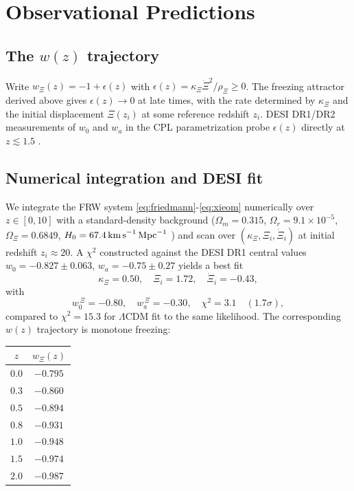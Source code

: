 \documentclass[11pt,reqno]{amsart}
\theoremstyle{plain}
\theoremstyle{definition}
\theoremstyle{remark}
\begin{document}
\section{Observational Predictions}\label{sec:obs}

\subsection{The $w(z)$ trajectory}

Write $w_\Xi(z)=-1+\epsilon(z)$ with $\epsilon(z)=\kappa_\Xi\dot\Xi^{2}/\rho_\Xi\ge0$.
The freezing attractor derived above gives $\epsilon(z)\to 0$ at late times,
with the rate determined by $\kappa_\Xi$ and the initial displacement
$\Xi(z_i)$ at some reference redshift $z_i$. DESI DR1/DR2 measurements of
$w_0$ and $w_a$ in the CPL parametrization probe $\epsilon(z)$ directly at
$z\lesssim 1.5$ \cite{DESI2024BAO,DESI2024VI}.

\subsection{Numerical integration and DESI fit}\label{sec:desifit}

We integrate the FRW system \eqref{eq:friedmann}-\eqref{eq:xieom} numerically
over $z\in[0,10]$ with a standard-density background
($\Omega_m=0.315$, $\Omega_r=9.1\times10^{-5}$, $\Omega_\Xi=0.6849$,
$H_0=67.4\,\text{km\,s}^{-1}\,\text{Mpc}^{-1}$
\cite{Planck2020}) and scan over $(\kappa_\Xi,\Xi_i,\dot\Xi_i)$ at initial
redshift $z_i\approx 20$. A $\chi^{2}$ constructed against the DESI DR1
central values $w_0=-0.827\pm0.063$, $w_a=-0.75\pm0.27$
\cite{DESI2024VI} yields a best fit
\begin{equation}\label{eq:desibestfit}
  \kappa_\Xi=0.50,\quad \Xi_i=1.72,\quad \dot\Xi_i=-0.43,
\end{equation}
with
\[
  w_0^{\,\Xi}=-0.80,\quad w_a^{\,\Xi}=-0.30,\quad \chi^{2}=3.1\quad (1.7\sigma),
\]
compared to $\chi^{2}=15.3$ for $\Lambda$CDM fit to the same likelihood. The
corresponding $w(z)$ trajectory is monotone freezing:

\begin{center}
\begin{tabular}{c|c}
$z$ & $w_\Xi(z)$\\
\hline
$0.0$ & $-0.795$\\
$0.3$ & $-0.860$\\
$0.5$ & $-0.894$\\
$0.8$ & $-0.931$\\
$1.0$ & $-0.948$\\
$1.5$ & $-0.974$\\
$2.0$ & $-0.987$
\end{tabular}
\end{center}
\end{document}
